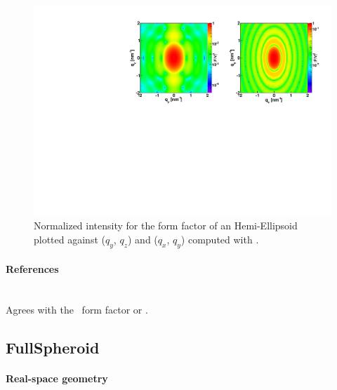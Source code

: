 \begin{figure}[H]
\begin{center}
\includegraphics[angle=-90,width=\textwidth]{fig/ff/figffhemiellips.pdf}
\end{center}
\caption{Normalized intensity for the form factor of an Hemi-Ellipsoid plotted against ($q_y$, $q_z$) and  ($q_x$, $q_y$)
  computed with .}
\label{fig:FFhemiellipsEx}
\end{figure}

\paragraph{References}\strut\\
Agrees with the \IsGISAXS\ form factor
\cite[Eq.~2.42, with wrong sign in the $z$-dependent phase factor]{Laz08}
or  \cite[Eq.~229]{ReLL09}.

\clearpage
\subsection{FullSpheroid} \label{sec:FullSpheroid}

\paragraph{Real-space geometry}\strut\\

